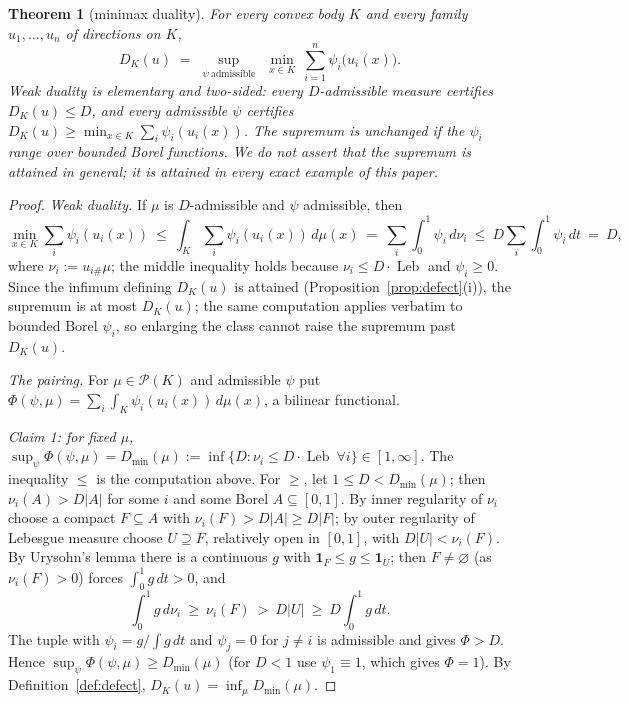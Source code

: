 \documentclass[11pt,reqno]{amsart}
\theoremstyle{plain}
\newtheorem{theorem}{Theorem}[section]
\theoremstyle{definition}
\theoremstyle{remark}
\newcommand{\Leb}{\operatorname{Leb}}
\begin{document}
\begin{theorem}[minimax duality]\label{thm:duality}
For every convex body $K$ and every family $u_1,\dots,u_n$ of directions on
$K$,
\[
D_K(u)\;=\;\sup_{\psi\ \mathrm{admissible}}\ \ \min_{x\in K}\
\sum_{i=1}^n\psi_i\bigl(u_i(x)\bigr).
\]
Weak duality is elementary and two-sided: every $D$-admissible measure
certifies $D_K(u)\le D$, and every admissible $\psi$ certifies
$D_K(u)\ge\min_{x\in K}\sum_i\psi_i(u_i(x))$. The supremum is unchanged if the
$\psi_i$ range over bounded Borel functions. We do \emph{not} assert that the
supremum is attained in general; it is attained in every exact example of
this paper.
\end{theorem}

\begin{proof}
\emph{Weak duality.} If $\mu$ is $D$-admissible and $\psi$ admissible, then
\[
\min_{x\in K}\sum_i\psi_i(u_i(x))\ \le\
\int_K\sum_i\psi_i(u_i(x))\,d\mu(x)\ =\ \sum_i\int_0^1\psi_i\,d\nu_i\ \le\
D\sum_i\int_0^1\psi_i\,dt\ =\ D,
\]
where $\nu_i:=u_{i\#}\mu$; the middle inequality holds because
$\nu_i\le D\cdot\Leb$ and $\psi_i\ge0$. Since the infimum defining $D_K(u)$ is
attained (Proposition~\ref{prop:defect}(i)), the supremum is at most
$D_K(u)$; the same computation applies verbatim to bounded Borel $\psi_i$, so
enlarging the class cannot raise the supremum past $D_K(u)$.

\emph{The pairing.} For $\mu\in\mathcal P(K)$ and admissible $\psi$ put
$\Phi(\psi,\mu)=\sum_i\int_K\psi_i(u_i(x))\,d\mu(x)$, a bilinear functional.

\emph{Claim 1: for fixed $\mu$,}
$\sup_\psi\Phi(\psi,\mu)=D_{\min}(\mu):=\inf\{D:\nu_i\le D\cdot\Leb\ \forall
i\}\in[1,\infty]$. The inequality $\le$ is the computation above. For $\ge$,
let $1\le D<D_{\min}(\mu)$; then $\nu_i(A)>D|A|$ for some $i$ and some Borel
$A\subseteq[0,1]$. By inner regularity of $\nu_i$ choose a compact $F\subseteq
A$ with $\nu_i(F)>D|A|\ge D|F|$; by outer regularity of Lebesgue measure
choose $U\supseteq F$, relatively open in $[0,1]$, with $D|U|<\nu_i(F)$. By
Urysohn's lemma there is a continuous $g$ with
$\mathbf1_F\le g\le\mathbf1_U$; then $F\ne\varnothing$ (as $\nu_i(F)>0$)
forces $\int_0^1g\,dt>0$, and
\[
\int_0^1 g\,d\nu_i\ \ge\ \nu_i(F)\ >\ D|U|\ \ge\ D\int_0^1g\,dt .
\]
The tuple with $\psi_i=g/\int g\,dt$ and $\psi_j=0$ for $j\ne i$ is
admissible and gives $\Phi>D$. Hence $\sup_\psi\Phi(\psi,\mu)\ge D_{\min}(\mu)$
(for $D<1$ use $\psi_1\equiv1$, which gives $\Phi=1$). By
Definition~\ref{def:defect}, $D_K(u)=\inf_{\mu}D_{\min}(\mu)$.


\end{proof}
\end{document}
